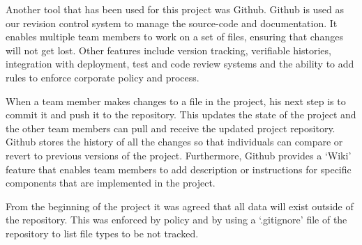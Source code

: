 Another tool that has been used for this project was Github. Github is used as our revision control system to manage 
the source-code and documentation. It enables multiple team members to work on a set of files, 
ensuring that changes will not get lost. Other features include version tracking, verifiable histories, integration with deployment, 
test and code review systems and the ability to add rules to enforce corporate policy and process.

When a team member makes changes to a file in the project, his next step is to commit it and push it to the repository. 
This updates the state of the project and the other team members can pull and receive the updated project repository. 
Github stores the history of all the changes so that individuals can compare or revert 
to previous versions of the project. Furthermore, Github provides a `Wiki' feature that enables team members 
to add description or instructions for specific components that are implemented in the project.

From the beginning of the project it was agreed that all data will exist outside of the repository. This was enforced by 
policy and by using a `.gitignore' file of the repository to list file types to be not tracked.



